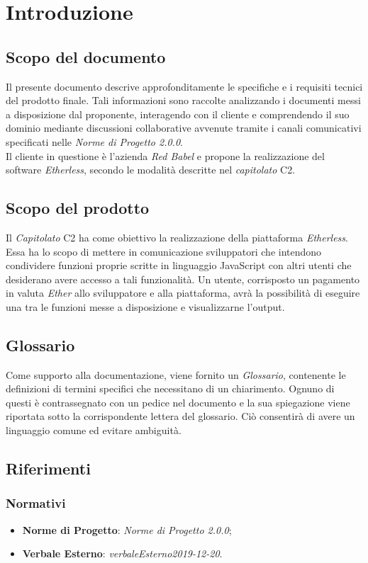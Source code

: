 \section{Introduzione}

\subsection{Scopo del documento}
Il presente documento descrive approfonditamente le specifiche e i requisiti tecnici del prodotto finale. Tali informazioni sono raccolte analizzando i documenti messi a disposizione dal proponente, interagendo con il cliente e comprendendo il suo dominio mediante discussioni collaborative avvenute tramite i canali comunicativi specificati nelle \textit{Norme di Progetto 2.0.0}\docs.\\
Il cliente in questione è l'azienda \textit{Red Babel} e propone la realizzazione del software \textit{Etherless}, secondo le modalità descritte nel \textit{capitolato\glo} C2.

\subsection{Scopo del prodotto}
Il \textit{Capitolato\glo} C2 ha come obiettivo la realizzazione della piattaforma \textit{Etherless}. Essa ha lo scopo di mettere in comunicazione sviluppatori che intendono condividere funzioni proprie scritte in linguaggio JavaScript con altri utenti che desiderano avere accesso a tali funzionalità. Un utente, corrisposto un pagamento in valuta \textit{Ether\glo} allo sviluppatore e alla piattaforma, avrà la possibilità di eseguire una tra le funzioni messe a disposizione e visualizzarne l'output.

\subsection{Glossario}
Come supporto alla documentazione, viene fornito un \textit{Glossario}\docs,
contenente le definizioni di termini specifici che necessitano di un chiarimento.
Ognuno di questi è contrassegnato con un pedice \glo nel documento e la sua
spiegazione viene riportata sotto la corrispondente lettera del glossario. Ciò
consentir\`a di avere un linguaggio comune ed evitare ambiguità.
	
\subsection{Riferimenti}
\subsubsection{Normativi}
	\begin{itemize}
		\item \textbf{Norme di Progetto}: \textit{Norme di Progetto 2.0.0\docs};
		\item \textbf{Verbale Esterno}: \textit{verbaleEsterno2019-12-20\docs}.
	\end{itemize}
